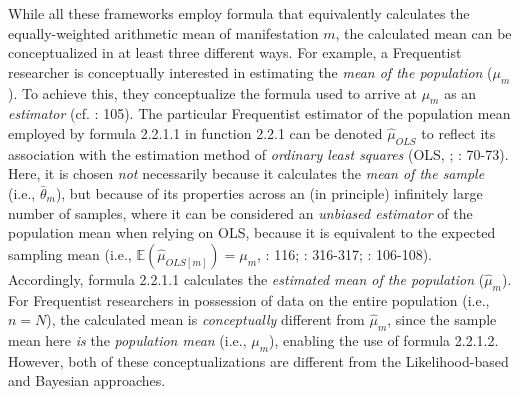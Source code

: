 \documentclass[
  10pt,
  a4paper,
  twoside]{article}
\begin{document}
While all these frameworks employ formula that equivalently calculates the equally-weighted arithmetic mean of manifestation \(m\), the calculated mean can be conceptualized in at least three different ways. For example, a Frequentist researcher is conceptually interested in estimating the \emph{mean of the population} (\(\mu_m\)). To achieve this, they conceptualize the formula used to arrive at \(\mu_m\) as an \emph{estimator} (cf. : 105). The particular Frequentist estimator of the population mean employed by formula 2.2.1.1 in function 2.2.1 can be denoted \(\hat{\mu}_{OLS}\) to reflect its association with the estimation method of \emph{ordinary least squares} (OLS, ; : 70-73). Here, it is chosen \emph{not} necessarily because it calculates the \emph{mean of the sample} (i.e., \(\bar{\theta}_m\)), but because of its properties across an (in principle) infinitely large number of samples, where it can be considered an \emph{unbiased estimator} of the population mean when relying on OLS, because it is equivalent to the expected sampling mean (i.e., \(\mathbb{E}(\hat{\mu}_{OLS[m]}) = \mu_m\), : 116; : 316-317; : 106-108). Accordingly, formula 2.2.1.1 calculates the \emph{estimated mean of the population} (\(\hat{\mu}_m\)). For Frequentist researchers in possession of data on the entire population (i.e., \(n = N\)), the calculated mean is \emph{conceptually} different from \(\hat{\mu}_m\), since the sample mean here \emph{is} the \emph{population mean} (i.e., \(\mu_m\)), enabling the use of formula 2.2.1.2. However, both of these conceptualizations are different from the Likelihood-based and Bayesian approaches.
\end{document}
